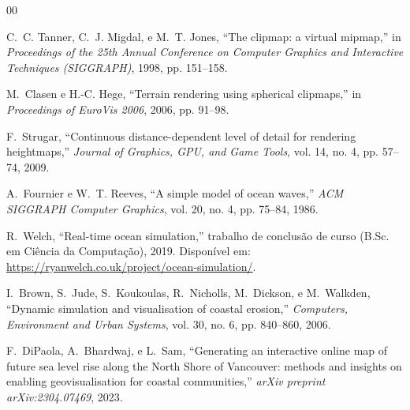 \documentclass[conference]{IEEEtran}
\begin{document}
\begin{thebibliography}{00}

 C.~C. Tanner, C.~J. Migdal, e M.~T. Jones, ``The
clipmap: a virtual mipmap,'' in \emph{Proceedings of the 25th Annual
Conference on Computer Graphics and Interactive Techniques (SIGGRAPH)},
1998, pp. 151--158.

 M.~Clasen e H.-C. Hege, ``Terrain rendering
using spherical clipmaps,'' in \emph{Proceedings of EuroVis 2006}, 2006,
pp. 91--98.

 F.~Strugar, ``Continuous distance-dependent level
of detail for rendering heightmaps,'' \emph{Journal of Graphics, GPU,
and Game Tools}, vol. 14, no. 4, pp. 57--74, 2009.

 A.~Fournier e W.~T. Reeves, ``A simple model
of ocean waves,'' \emph{ACM SIGGRAPH Computer Graphics}, vol. 20, no. 4,
pp. 75--84, 1986.

 R.~Welch, ``Real-time ocean simulation,'' trabalho de
conclusão de curso (B.Sc. em Ciência da Computação), 2019. Disponível em:
\url{https://ryanwelch.co.uk/project/ocean-simulation/}.

 I.~Brown, S.~Jude, S.~Koukoulas, R.~Nicholls,
M.~Dickson, e M.~Walkden, ``Dynamic simulation and visualisation of
coastal erosion,'' \emph{Computers, Environment and Urban Systems},
vol. 30, no. 6, pp. 840--860, 2006.

 F.~DiPaola, A.~Bhardwaj, e L.~Sam, ``Generating an
interactive online map of future sea level rise along the North Shore of
Vancouver: methods and insights on enabling geovisualisation for coastal
communities,'' \emph{arXiv preprint arXiv:2304.07469}, 2023.

\end{thebibliography}
\end{document}
